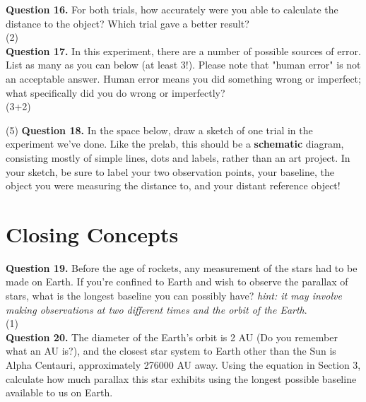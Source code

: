 \documentclass[11pt]{article}
\begin{document}
\textbf{Question 16.} For both trials, how accurately were you able to calculate the distance to the object? Which trial gave a better result?\\

\vspace{1.5cm}
(2) \hrulefill\\

\textbf{Question 17.} In this experiment, there are a number of possible sources of error. List as many as you can below (at least 3!). Please note that "human error" is not an acceptable answer. Human error means you did something wrong or imperfect; what specifically did you do wrong or imperfectly?\\

\vspace{4.5cm}
(3+2)\hrulefill

\newpage

(5) \textbf{Question 18.} In the space below, draw a sketch of one trial in the experiment we've done. Like the prelab, this should be a \textbf{schematic} diagram, consisting mostly of simple lines, dots and labels, rather than an art project. In your sketch, be sure to label your two observation points, your baseline, the object you were measuring the distance to, and your distant reference object!

\newpage

\section{Closing Concepts}
\textbf{Question 19.} Before the age of rockets, any measurement of the stars had to be made on Earth. If you're confined to Earth and wish to observe the parallax of stars, what is the longest baseline you can possibly have? \textit{hint: it may involve making observations at two different times and the orbit of the Earth}.\\

\vspace{1.5cm}
(1) \hrulefill\\

\textbf{Question 20.} The diameter of the Earth's orbit is 2 AU (Do you remember what an AU is?), and the closest star system to Earth other than the Sun is Alpha Centauri, approximately 276000 AU away. Using the equation in Section 3, calculate how much parallax this star exhibits using the longest possible baseline available to us on Earth.\\
\end{document}
